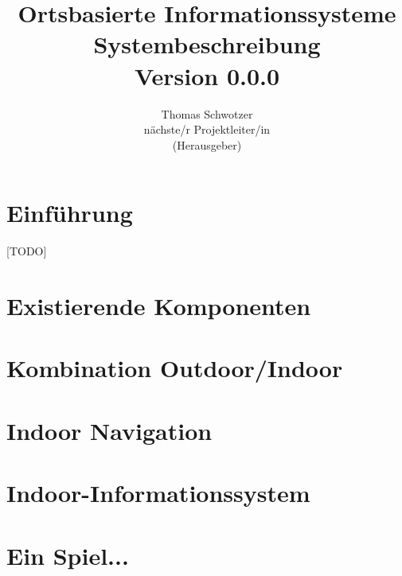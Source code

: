 \documentclass[german]{book}
\begin{document}
\title{Ortsbasierte Informationssysteme\\
Systembeschreibung \\
Version 0.0.0
}

\author{Thomas Schwotzer \\
nächste/r Projektleiter/in\\
(Herausgeber)
}

\maketitle

\tableofcontents

\chapter{Einführung}
[TODO]

\chapter{Existierende Komponenten}

\chapter{Kombination Outdoor/Indoor}
%

\chapter{Indoor Navigation}
%

\chapter{Indoor-Informationssystem}
%

\chapter{Ein Spiel...}
%
\end{document}
